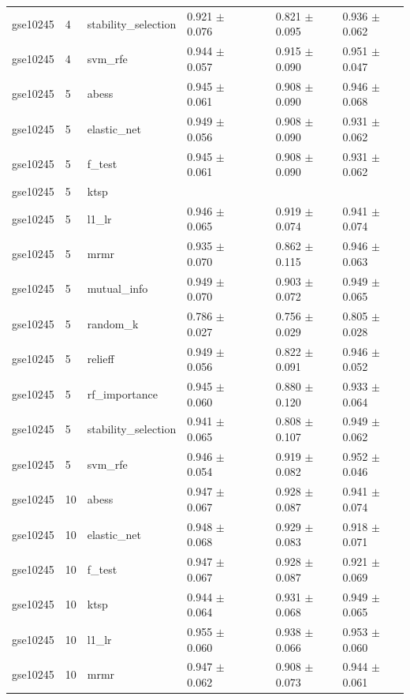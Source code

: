 \begin{table}[t]
\begin{tabular}{llllllll}
    gse10245 & 4 & stability\_selection & 0.921 $\pm$ 0.076 &  &  & 0.821 $\pm$ 0.095 & 0.936 $\pm$ 0.062 \\
    gse10245 & 4 & svm\_rfe & 0.944 $\pm$ 0.057 &  &  & 0.915 $\pm$ 0.090 & 0.951 $\pm$ 0.047 \\
    gse10245 & 5 & abess & 0.945 $\pm$ 0.061 &  &  & 0.908 $\pm$ 0.090 & 0.946 $\pm$ 0.068 \\
    gse10245 & 5 & elastic\_net & 0.949 $\pm$ 0.056 &  &  & 0.908 $\pm$ 0.090 & 0.931 $\pm$ 0.062 \\
    gse10245 & 5 & f\_test & 0.945 $\pm$ 0.061 &  &  & 0.908 $\pm$ 0.090 & 0.931 $\pm$ 0.062 \\
    gse10245 & 5 & ktsp &  &  &  &  &  \\
    gse10245 & 5 & l1\_lr & 0.946 $\pm$ 0.065 &  &  & 0.919 $\pm$ 0.074 & 0.941 $\pm$ 0.074 \\
    gse10245 & 5 & mrmr & 0.935 $\pm$ 0.070 &  &  & 0.862 $\pm$ 0.115 & 0.946 $\pm$ 0.063 \\
    gse10245 & 5 & mutual\_info & 0.949 $\pm$ 0.070 &  &  & 0.903 $\pm$ 0.072 & 0.949 $\pm$ 0.065 \\
    gse10245 & 5 & random\_k & 0.786 $\pm$ 0.027 &  &  & 0.756 $\pm$ 0.029 & 0.805 $\pm$ 0.028 \\
    gse10245 & 5 & relieff & 0.949 $\pm$ 0.056 &  &  & 0.822 $\pm$ 0.091 & 0.946 $\pm$ 0.052 \\
    gse10245 & 5 & rf\_importance & 0.945 $\pm$ 0.060 &  &  & 0.880 $\pm$ 0.120 & 0.933 $\pm$ 0.064 \\
    gse10245 & 5 & stability\_selection & 0.941 $\pm$ 0.065 &  &  & 0.808 $\pm$ 0.107 & 0.949 $\pm$ 0.062 \\
    gse10245 & 5 & svm\_rfe & 0.946 $\pm$ 0.054 &  &  & 0.919 $\pm$ 0.082 & 0.952 $\pm$ 0.046 \\
    gse10245 & 10 & abess & 0.947 $\pm$ 0.067 &  &  & 0.928 $\pm$ 0.087 & 0.941 $\pm$ 0.074 \\
    gse10245 & 10 & elastic\_net & 0.948 $\pm$ 0.068 &  &  & 0.929 $\pm$ 0.083 & 0.918 $\pm$ 0.071 \\
    gse10245 & 10 & f\_test & 0.947 $\pm$ 0.067 &  &  & 0.928 $\pm$ 0.087 & 0.921 $\pm$ 0.069 \\
    gse10245 & 10 & ktsp & 0.944 $\pm$ 0.064 &  &  & 0.931 $\pm$ 0.068 & 0.949 $\pm$ 0.065 \\
    gse10245 & 10 & l1\_lr & 0.955 $\pm$ 0.060 &  &  & 0.938 $\pm$ 0.066 & 0.953 $\pm$ 0.060 \\
    gse10245 & 10 & mrmr & 0.947 $\pm$ 0.062 &  &  & 0.908 $\pm$ 0.073 & 0.944 $\pm$ 0.061 \\

\end{tabular}
\end{table}

